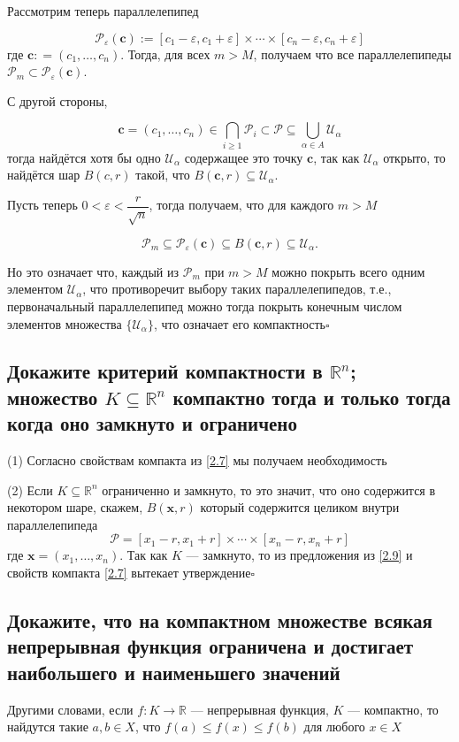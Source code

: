 \documentclass[a4paper]{article}
\newcommand{\qed}{\hfill$\square$}
\newcommand{\m}[1]{\mathbf{#1}}
\begin{document}
Рассмотрим теперь параллелепипед

$$
\mathcal{P}_\varepsilon(\m{c}):= [c_1 - \varepsilon, c_1 + \varepsilon] \times \cdots \times [c_n - \varepsilon, c_n + \varepsilon]
$$
где $\m{c}: = (c_1,\ldots, c_n)$. Тогда, для всех $m>M$, получаем что все параллелепипеды $\mathcal{P}_m \subset \mathcal{P}_\varepsilon(\m{c})$.

С другой стороны, 

$$
\m{c} = (c_1,\ldots, c_n) \in \bigcap_{i \ge 1} \mathcal{P}_i \subset \mathcal{P} \subseteq \bigcup_{\alpha \in A} \mathscr{U}_\alpha
$$
тогда найдётся хотя бы одно $\mathscr{U}_\alpha$ содержащее это точку $\m{c}$, так как $\mathscr{U}_\alpha$ открыто, то найдётся шар $B(c, r)$ такой, что $B(\m{c}, r) \subseteq \mathscr{U}_\alpha$.

Пусть теперь $0 < \varepsilon < \dfrac{r}{\sqrt{n}}$, тогда получаем, что для каждого $m>M$

$$
\mathcal{P}_m \subseteq \mathcal{P}_\varepsilon(\m{c}) \subseteq B(\m{c}, r) \subseteq \mathscr{U}_\alpha.
$$

Но это означает что, каждый из $\mathcal{P}_m$ при $m >M$ можно покрыть всего одним элементом $\mathscr{U}_\alpha$, что противоречит выбору таких параллелепипедов, т.е., первоначальный параллелепипед можно тогда покрыть конечным числом элементов множества $\{\mathscr{U}_\alpha\}$, что означает его компактность\qed

\subsection{Докажите критерий компактности в $\mathbb{R}^{n}$; множество $K \subseteq \mathbb{R}^{n}$ компактно тогда и только тогда когда оно замкнуто и ограничено}
(1) Согласно свойствам компакта из \ref{2.7} мы получаем необходимость
\label{2.10}

(2) Если $K \subseteq \mathbb{R}^n$ ограниченно и замкнуто, то это значит, что оно содержится в некотором шаре, скажем, $B(\m{x}, r)$ который содержится целиком внутри параллелепипеда
$$
\mathcal{P} = [x_1- r,x_1+r] \times \cdots \times [x_n-r, x_n+r]
$$
где $\m{x} = (x_1, \ldots, x_n)$. Так как $K$ — замкнуто, то из предложения из \ref{2.9} и свойств компакта \ref{2.7} вытекает утверждение\qed


\subsection{Докажите, что на компактном множестве всякая непрерывная функция ограничена и достигает наибольшего и наименьшего значений}
Другими словами, если $f:K \to \mathbb{R}$ — непрерывная функция, $K$ — компактно, то найдутся такие $a,b \in X$, что $f(a) \le f(x) \le f(b)$ для любого $x \in X$\\
\end{document}
